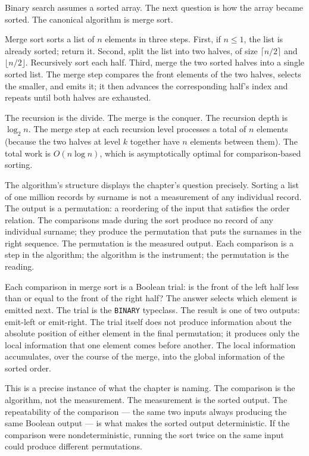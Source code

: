 Binary search assumes a sorted array. The next question is how the array
became sorted. The canonical algorithm is merge sort.

Merge sort sorts a list of $n$ elements in three steps. First, if $n \le 1$,
the list is already sorted; return it. Second, split the list into two
halves, of size $\lceil n/2 \rceil$ and $\lfloor n/2 \rfloor$. Recursively
sort each half. Third, merge the two sorted halves into a single sorted
list. The merge step compares the front elements of the two halves,
selects the smaller, and emits it; it then advances the corresponding
half's index and repeats until both halves are exhausted.

The recursion is the divide. The merge is the conquer. The recursion depth
is $\log_2 n$. The merge step at each recursion level processes a total of
$n$ elements (because the two halves at level $k$ together have $n$
elements between them). The total work is $O(n \log n)$, which is
asymptotically optimal for comparison-based sorting.

The algorithm's structure displays the chapter's question precisely.
Sorting a list of one million records by surname is not a measurement of
any individual record. The output is a permutation: a reordering of the
input that satisfies the order relation. The comparisons made during the
sort produce no record of any individual surname; they produce the
permutation that puts the surnames in the right sequence. The
permutation is the measured output. Each comparison is a step in the
algorithm; the algorithm is the instrument; the permutation is the
reading.

Each comparison in merge sort is a Boolean trial: is the front of the
left half less than or equal to the front of the right half? The answer
selects which element is emitted next. The trial is the
\texttt{BINARY} typeclass. The result is one of two outputs: emit-left
or emit-right. The trial itself does not produce information about the
absolute position of either element in the final permutation; it
produces only the local information that one element comes before
another. The local information accumulates, over the course of the
merge, into the global information of the sorted order.

This is a precise instance of what the chapter is naming. The
comparison is the algorithm, not the measurement. The measurement is the
sorted output. The repeatability of the comparison --- the same two
inputs always producing the same Boolean output --- is what makes the
sorted output deterministic. If the comparison were nondeterministic,
running the sort twice on the same input could produce different
permutations.


